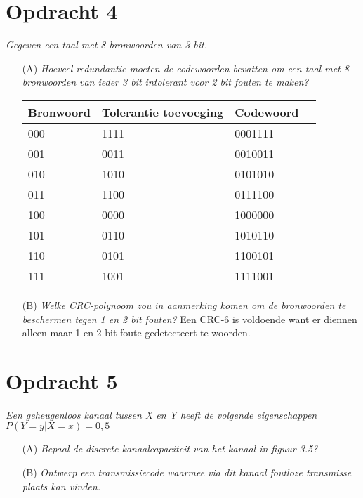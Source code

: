 \section{Opdracht 4}
\emph{Gegeven een taal met 8 bronwoorden van 3 bit.}

\begin{itemize}
\item[(A)] \emph{Hoeveel redundantie moeten de codewoorden bevatten om een taal met 8 bronwoorden van ieder 3 bit intolerant voor 2 bit fouten te maken?}

\begin{tabular}{|l|l|l|l|}
  \hline
  Bronwoord & Tolerantie toevoeging & Codewoord \\ \hline
  000 & 1111 & 0001111 \\ \hline
  001 & 0011 & 0010011 \\ \hline
  010 & 1010 & 0101010 \\ \hline
  011 & 1100 & 0111100 \\ \hline
  100 & 0000 & 1000000 \\ \hline
  101 & 0110 & 1010110 \\ \hline
  110 & 0101 & 1100101 \\ \hline
  111 & 1001 & 1111001 \\ \hline
\end{tabular}

\item[(B)] \emph{Welke CRC-polynoom zou in aanmerking komen om de bronwoorden te beschermen tegen 1 en 2 bit fouten?}
Een CRC-6 is voldoende want er diennen alleen maar 1 en 2 bit foute gedetecteert te woorden.
\end{itemize}

\section{Opdracht 5}
\emph{Een geheugenloos kanaal tussen \emph{X} en \emph{Y} heeft de volgende eigenschappen $P(Y=y|X=x)=0,5$}
\begin{itemize}
  \item[(A)] \emph{Bepaal de discrete kanaalcapaciteit van het kanaal in figuur 3.5?}
  \item[(B)] \emph{Ontwerp een transmissiecode waarmee via dit kanaal foutloze transmisse plaats kan vinden.}
\end{itemize}
